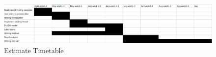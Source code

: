 \documentclass[a4paper,12pt]{article}
\begin{document}
	\begin{figure}[htbp]
		\centering 
		\includegraphics[width=1.1\textwidth]{timetable.jpeg} 
		\caption{Estimate Timetable}
		\label{Fig.main2}
	\end{figure}





  

\end{document}
